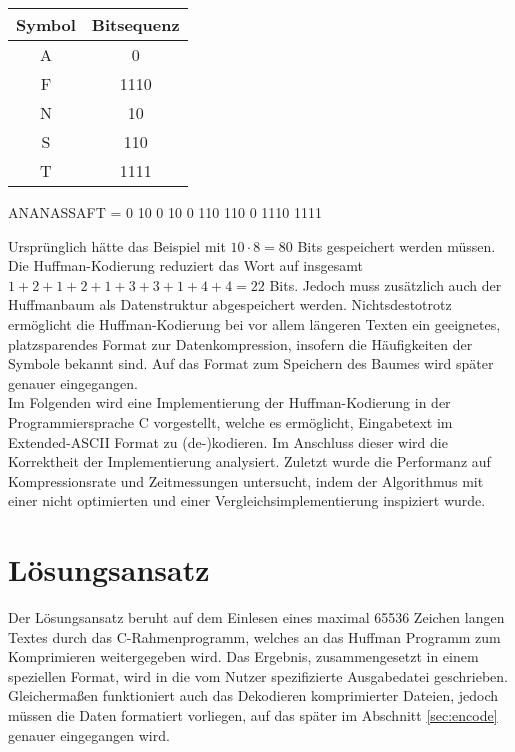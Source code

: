 \documentclass[course=erap]{aspdoc}
\begin{document}
\begin{center}
    \begin{tabular}{c|c}
        \textbf{Symbol} & \textbf{Bitsequenz} \\
        \hline
        A & 0 \\
        F & 1110 \\
        N & 10 \\
        S & 110 \\
        T & 1111
    \end{tabular}
    \label{tab:my_label}
\end{center}
\begin{center}
    ANANASSAFT = 0 10 0 10 0 110 110 0 1110 1111
\end{center}
Ursprünglich hätte das Beispiel mit $10\cdot8 = 80$ Bits gespeichert werden müssen. Die Huffman-Kodierung reduziert das Wort auf insgesamt $1+2+1+2+1+3+3+1+4+4=22$ Bits. Jedoch muss zusätzlich auch der Huffmanbaum als Datenstruktur abgespeichert werden. Nichtsdestotrotz ermöglicht die Huffman-Kodierung bei vor allem längeren Texten ein geeignetes, platzsparendes Format zur Datenkompression, insofern die Häufigkeiten der Symbole bekannt sind. Auf das Format zum Speichern des Baumes wird später genauer eingegangen.\cite{4051119}\\
Im Folgenden wird eine Implementierung der Huffman-Kodierung in der Programmiersprache C vorgestellt, welche es ermöglicht, Eingabetext im Extended-ASCII Format zu (de-)kodieren. Im Anschluss dieser wird die Korrektheit der Implementierung analysiert. Zuletzt wurde die Performanz auf Kompressionsrate und Zeitmessungen untersucht, indem der Algorithmus mit einer nicht optimierten und einer Vergleichsimplementierung inspiziert wurde.

\section{Lösungsansatz}

Der Lösungsansatz beruht auf dem Einlesen eines maximal 65536 Zeichen langen Textes durch das C-Rahmenprogramm, welches an das Huffman Programm zum Komprimieren weitergegeben wird. Das Ergebnis, zusammengesetzt in einem speziellen Format, wird in die vom Nutzer spezifizierte Ausgabedatei geschrieben. Gleichermaßen funktioniert auch das Dekodieren komprimierter Dateien, jedoch müssen die Daten formatiert vorliegen, auf das später im Abschnitt \ref{sec:encode} genauer eingegangen wird.
\end{document}
